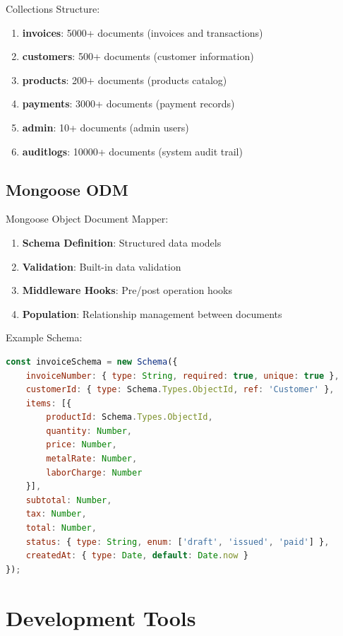 \documentclass[12pt,a4paper]{report}
\begin{document}
Collections Structure:

\begin{enumerate}[label=\roman*)]
    \item \textbf{invoices}: 5000+ documents (invoices and transactions)
    \item \textbf{customers}: 500+ documents (customer information)
    \item \textbf{products}: 200+ documents (products catalog)
    \item \textbf{payments}: 3000+ documents (payment records)
    \item \textbf{admin}: 10+ documents (admin users)
    \item \textbf{auditlogs}: 10000+ documents (system audit trail)
\end{enumerate}

\subsection{Mongoose ODM}

Mongoose Object Document Mapper:

\begin{enumerate}[label=\roman*)]
    \item \textbf{Schema Definition}: Structured data models
    \item \textbf{Validation}: Built-in data validation
    \item \textbf{Middleware Hooks}: Pre/post operation hooks
    \item \textbf{Population}: Relationship management between documents
\end{enumerate}

Example Schema:

\begin{lstlisting}[language=JavaScript, caption=Invoice Schema Definition]
const invoiceSchema = new Schema({
    invoiceNumber: { type: String, required: true, unique: true },
    customerId: { type: Schema.Types.ObjectId, ref: 'Customer' },
    items: [{
        productId: Schema.Types.ObjectId,
        quantity: Number,
        price: Number,
        metalRate: Number,
        laborCharge: Number
    }],
    subtotal: Number,
    tax: Number,
    total: Number,
    status: { type: String, enum: ['draft', 'issued', 'paid'] },
    createdAt: { type: Date, default: Date.now }
});
\end{lstlisting}

\section{Development Tools}
\end{document}
